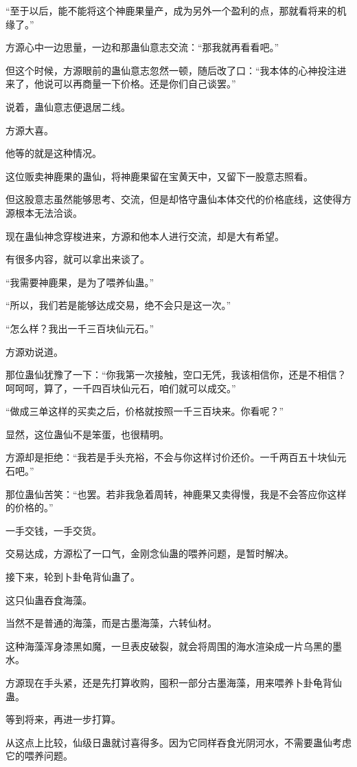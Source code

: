 \begin{this_body}
“至于以后，能不能将这个神鹿果量产，成为另外一个盈利的点，那就看将来的机缘了。”

方源心中一边思量，一边和那蛊仙意志交流：“那我就再看看吧。”

但这个时候，方源眼前的蛊仙意志忽然一顿，随后改了口：“我本体的心神投注进来了，他说可以再商量一下价格。还是你们自己谈罢。”

说着，蛊仙意志便退居二线。

方源大喜。

他等的就是这种情况。

这位贩卖神鹿果的蛊仙，将神鹿果留在宝黄天中，又留下一股意志照看。

但这股意志虽然能够思考、交流，但是却恪守蛊仙本体交代的价格底线，这使得方源根本无法洽谈。

现在蛊仙神念穿梭进来，方源和他本人进行交流，却是大有希望。

有很多内容，就可以拿出来谈了。

“我需要神鹿果，是为了喂养仙蛊。”

“所以，我们若是能够达成交易，绝不会只是这一次。”

“怎么样？我出一千三百块仙元石。”

方源劝说道。

那位蛊仙犹豫了一下：“你我第一次接触，空口无凭，我该相信你，还是不相信？呵呵呵，算了，一千四百块仙元石，咱们就可以成交。”

“做成三单这样的买卖之后，价格就按照一千三百块来。你看呢？”

显然，这位蛊仙不是笨蛋，也很精明。

方源却是拒绝：“我若是手头充裕，不会与你这样讨价还价。一千两百五十块仙元石吧。”

那位蛊仙苦笑：“也罢。若非我急着周转，神鹿果又卖得慢，我是不会答应你这样的价格的。”

一手交钱，一手交货。

交易达成，方源松了一口气，金刚念仙蛊的喂养问题，是暂时解决。

接下来，轮到卜卦龟背仙蛊了。

这只仙蛊吞食海藻。

当然不是普通的海藻，而是古墨海藻，六转仙材。

这种海藻浑身漆黑如魔，一旦表皮破裂，就会将周围的海水渲染成一片乌黑的墨水。

方源现在手头紧，还是先打算收购，囤积一部分古墨海藻，用来喂养卜卦龟背仙蛊。

等到将来，再进一步打算。

从这点上比较，仙级日蛊就讨喜得多。因为它同样吞食光阴河水，不需要蛊仙考虑它的喂养问题。


\end{this_body}
